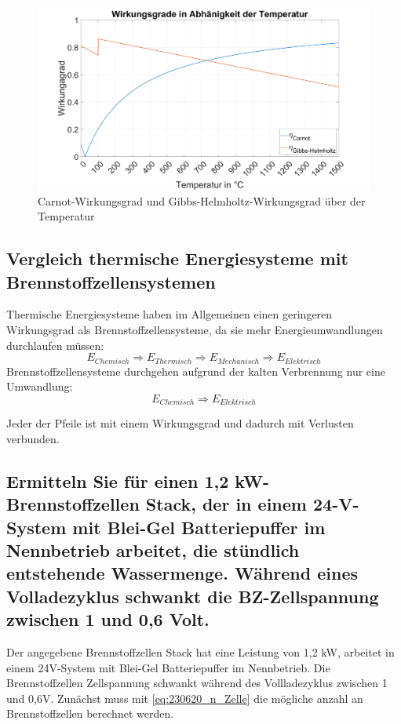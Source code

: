 \begin{figure}[H]
    \centering
    \includegraphics[width=\textwidth]{Abbildungen/Wirkungsgrade.png}
    \caption{Carnot-Wirkungsgrad und Gibbs-Helmholtz-Wirkungsgrad über der Temperatur}
    \label{fig:230620_Wirkungsgrade}
\end{figure}

\subsection{Vergleich thermische Energiesysteme mit Brennstoffzellensystemen}

Thermische Energiesysteme haben im Allgemeinen einen geringeren Wirkungsgrad als Brennstoffzellensysteme, da sie  mehr Energieumwandlungen durchlaufen müssen:
$$E_{Chemisch} \Rightarrow E_{Thermisch} \Rightarrow E_{Mechanisch} \Rightarrow E_{Elektrisch}$$ 
Brennstoffzellensysteme durchgehen aufgrund der kalten Verbrennung nur eine Umwandlung:
$$E_{Chemisch} \Rightarrow E_{Elektrisch}$$

Jeder der Pfeile ist mit einem Wirkungsgrad und dadurch mit Verlusten verbunden.

\subsection{Ermitteln Sie für einen 1,2 kW-Brennstoffzellen Stack, der in einem 24-V-System mit
Blei-Gel Batteriepuffer im Nennbetrieb arbeitet, die stündlich entstehende Wassermenge.
Während eines Volladezyklus schwankt die BZ-Zellspannung zwischen 1 und 0,6 Volt.}
\label{sec:VF_H2O_Menge}

Der angegebene Brennstoffzellen Stack hat eine Leistung von 1,2 kW, arbeitet in einem 24V-System mit Blei-Gel Batteriepuffer im Nennbetrieb.
Die Brennstoffzellen Zellspannung schwankt während des Vollladezyklus zwischen 1 und 0,6V.
Zunächst muss mit \autoref{eq:230620_n_Zelle} die mögliche anzahl an Brennstoffzellen berechnet werden.

